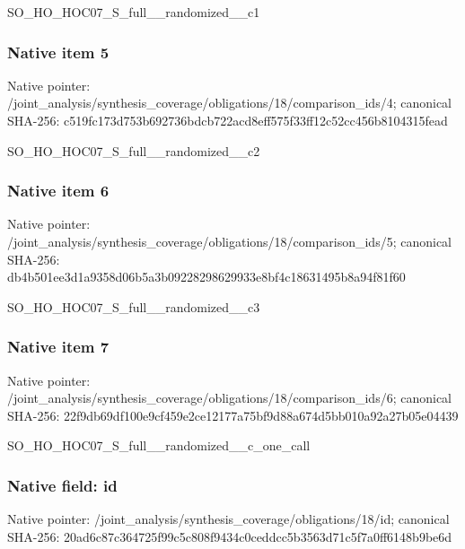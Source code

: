 \documentclass[10pt,a4paper]{article}
\begin{document}
\begingroup\raggedright\sloppy SO\_\allowbreak{}HO\_\allowbreak{}HOC07\_\allowbreak{}S\_\allowbreak{}full\_\allowbreak{}\_\allowbreak{}randomized\_\allowbreak{}\_\allowbreak{}c1\par\endgroup

\subsubsection{Native item 5}
Native pointer: /joint\_\allowbreak{}analysis/synthesis\_\allowbreak{}coverage/obligations/18/comparison\_\allowbreak{}ids/4; canonical SHA-256: c519fc173d753b692736bdcb722acd8eff575f33ff12c52cc456b8104315fead

\begingroup\raggedright\sloppy SO\_\allowbreak{}HO\_\allowbreak{}HOC07\_\allowbreak{}S\_\allowbreak{}full\_\allowbreak{}\_\allowbreak{}randomized\_\allowbreak{}\_\allowbreak{}c2\par\endgroup

\subsubsection{Native item 6}
Native pointer: /joint\_\allowbreak{}analysis/synthesis\_\allowbreak{}coverage/obligations/18/comparison\_\allowbreak{}ids/5; canonical SHA-256: db4b501ee3d1a9358d06b5a3b09228298629933e8bf4c18631495b8a94f81f60

\begingroup\raggedright\sloppy SO\_\allowbreak{}HO\_\allowbreak{}HOC07\_\allowbreak{}S\_\allowbreak{}full\_\allowbreak{}\_\allowbreak{}randomized\_\allowbreak{}\_\allowbreak{}c3\par\endgroup

\subsubsection{Native item 7}
Native pointer: /joint\_\allowbreak{}analysis/synthesis\_\allowbreak{}coverage/obligations/18/comparison\_\allowbreak{}ids/6; canonical SHA-256: 22f9db69df100e9cf459e2ce12177a75bf9d88a674d5bb010a92a27b05e04439

\begingroup\raggedright\sloppy SO\_\allowbreak{}HO\_\allowbreak{}HOC07\_\allowbreak{}S\_\allowbreak{}full\_\allowbreak{}\_\allowbreak{}randomized\_\allowbreak{}\_\allowbreak{}c\_\allowbreak{}one\_\allowbreak{}call\par\endgroup

\subsubsection{Native field: id}
Native pointer: /joint\_\allowbreak{}analysis/synthesis\_\allowbreak{}coverage/obligations/18/id; canonical SHA-256: 20ad6c87c364725f99c5c808f9434c0ceddcc5b3563d71c5f7a0ff6148b9be6d
\end{document}

